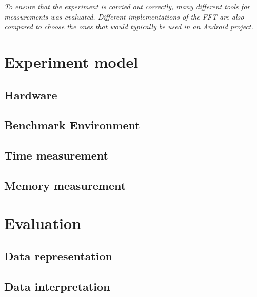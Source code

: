 \textit{To ensure that the experiment is carried out correctly, many different tools for measurements was evaluated. Different implementations of the FFT are also compared to choose the ones that would typically be used in an Android project.}

\section{Experiment model}

\subsection{Hardware}
\subsection{Benchmark Environment}
\subsection{Time measurement}
\subsection{Memory measurement}

\section{Evaluation}

\subsection{Data representation}
\subsection{Data interpretation}
